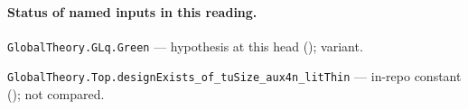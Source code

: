 

\paragraph{Status of named inputs in this reading.}
\noindent\nolinkurl{GlobalTheory.GLq.Green} --- hypothesis at this head (); variant.\par
\noindent\nolinkurl{GlobalTheory.Top.designExists_of_tuSize_aux4n_litThin} --- in-repo constant (); not compared.\par

